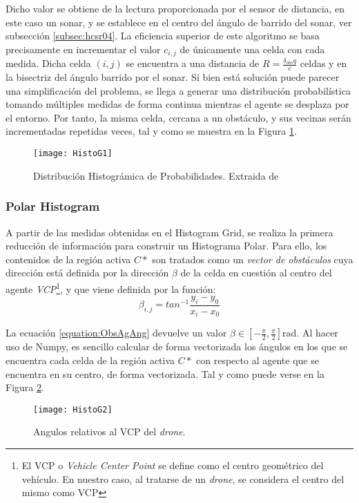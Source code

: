 Dicho valor se obtiene de la lectura proporcionada por el sensor de distancia, en este caso un sonar, y se establece en el centro del ángulo de barrido del sonar, ver subsección \ref{subsec:hcsr04}. 
La eficiencia superior de este algoritmo se basa precisamente en incrementar el valor $c_{i,j}$ de únicamente una celda con cada medida. Dicha celda $(i,j)$ se encuentra a una distancia de $R = \frac{\delta_{obs}q}{c}$ celdas y en la bisectriz del ángulo barrido por el sonar.
Si bien está solución puede parecer una simplificación del problema, se llega a generar una distribución probabilística tomando múltiples medidas de forma continua mientras el agente se desplaza por el entorno. Por tanto, la misma celda, cercana a un obstáculo, y sus vecinas serán incrementadas repetidas veces, tal y como se muestra en la Figura \ref{fig:histog1}.
 \begin{figure}[H]
	\centering
	\texttt{[image: HistoG1]}
	\caption[Distribución Histográmica de Probabilidades.]{Distribución Histográmica de Probabilidades. Extraida de \citep{art:BorensteinKorenVFH}}\label{fig:histog1}
\end{figure}

\subsubsection{Polar Histogram}
\label{subsubsec:PH}
A partir de las medidas obtenidas en el Histogram Grid, se realiza la primera reducción de información para construir un Histograma Polar. Para ello, los contenidos de la región activa $C*$ son tratados como un \textit{vector de obstáculos} cuya dirección está definida por la dirección $\beta$ de la celda en cuestión al centro del agente \textit{VCP}\footnote{El VCP o \textit{Vehicle Center Point} se define como el centro geométrico del vehículo. En nuestro caso, al tratarse de un \emph{drone}, se considera el centro del mismo como VCP}, y que viene definida por la función:
\begin{equation}
\label{equation:ObsAgAng}
\beta_{i,j}= tan^{-1} \frac{y_i - y_0}{x_i - x_0}
\end{equation}

La ecuación \ref{equation:ObsAgAng} devuelve un valor $\beta \in [-\frac{\pi}{2}, \frac{\pi}{2}]\text{rad}$. Al hacer uso de Numpy, es sencillo calcular de forma vectorizada los ángulos en los que se encuentra cada celda de la región activa $C*$ con respecto al agente que se encuentra en su centro, de forma vectorizada. Tal y como puede verse en la Figura \ref{fig:histog2}.
 \begin{figure}[H]
	\centering
	\texttt{[image: HistoG2]}
	\caption{Angulos relativos al VCP del \emph{drone}.}\label{fig:histog2}
\end{figure}

